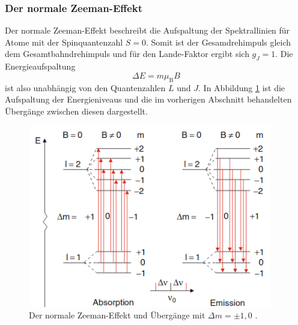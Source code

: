 \subsubsection*{Der normale Zeeman-Effekt}
Der normale Zeeman-Effekt beschreibt die Aufspaltung der Spektrallinien für Atome mit der Spinquantenzahl $S=0$. Somit ist der Gesamdrehimpuls gleich dem Gesamtbahndrehimpuls und für den Lande-Faktor ergibt sich $g_J=1$. Die Energieaufspaltung
\begin{equation}
    \label{eq:energie}
\Delta E = m \mu_\text{B}B
\end{equation}
ist also unabhängig von den Quantenzahlen $L$ und $J$. In Abbildung \ref{fig:tfig3} ist die Aufspaltung der Energieniveaus und die im vorherigen Abschnitt behandelten Übergänge zwischen diesen dargestellt.
\begin{figure}
\centering
\includegraphics[height=8.0cm]{normalzeeman.png}
\caption{Der normale Zeeman-Effekt und Übergänge mit $\Delta m = \pm 1, 0$ \cite{quelle01}.}
\label{fig:tfig3}
\end{figure}


